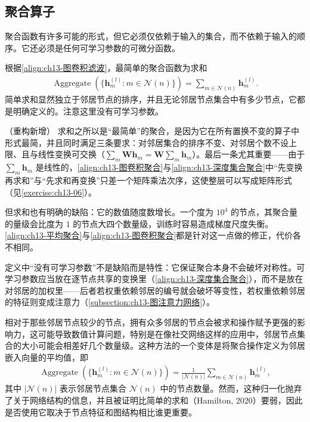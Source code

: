 \documentclass[../../main.tex]{subfiles}
\begin{document}
\subsection{聚合算子}\label{subsection:ch13-聚合算子}

聚合函数有许多可能的形式，但它必须仅依赖于输入的集合，而不依赖于输入的顺序。它还必须是任何可学习参数的可微分函数。

\begin{definition}[聚合算子]\label{definition:ch13-聚合算子}
根据\eqref{align:ch13-图卷积滤波}，最简单的聚合函数为求和
\begin{align}
\operatorname{Aggregate}\!\left(\{\bm{h}_m^{(l)}:m\in\mathcal{N}(n)\}\right)=\sum_{m\in\mathcal{N}(n)}\bm{h}_m^{(l)}.
\label{align:ch13-求和聚合}
\end{align}
简单求和显然独立于邻居节点的排序，并且无论邻居节点集合中有多少节点，它都是明确定义的。注意这里没有可学习参数。
\end{definition}

\begin{remark}（重构新增）
求和之所以是“最简单”的聚合，是因为它在所有置换不变的算子中形式最简，并且同时满足三条要求：对邻居集合的排序不变、对邻居个数不设上限、且与线性变换可交换（$\sum_m\bm{W}\bm{h}_m=\bm{W}\sum_m\bm{h}_m$）。最后一条尤其重要——由于 $\sum_m\bm{h}_m$ 是线性的，\eqref{align:ch13-图卷积聚合}与\eqref{align:ch13-深度集合聚合}中“先变换再求和”与“先求和再变换”只差一个矩阵乘法次序，这使整层可以写成矩阵形式（见\cref{exercise:ch13-06}）。\par
但求和也有明确的缺陷：它的数值随度数增长。一个度为 $10^4$ 的节点，其聚合量的量级会比度为 $1$ 的节点大四个数量级，训练时容易造成梯度尺度失衡。\eqref{align:ch13-平均聚合}与\eqref{align:ch13-图卷积聚合}都是针对这一点做的修正，代价各不相同。\par
定义中“没有可学习参数”不是缺陷而是特性：它保证聚合本身不会破坏对称性。可学习参数应当放在逐节点共享的变换里（\eqref{align:ch13-深度集合聚合}），而不是放在对邻居的加权里——后者若权重依赖邻居的编号就会破坏等变性，若权重依赖邻居的特征则变成注意力（\cref{subsection:ch13-图注意力网络}）。
\end{remark}

相对于那些邻居节点较少的节点，拥有众多邻居的节点会被求和操作赋予更强的影响力，这可能导致数值计算问题，特别是在像社交网络这样的应用中，邻居节点集合的大小可能会相差好几个数量级。这种方法的一个变体是将聚合操作定义为邻居嵌入向量的平均值，即
\begin{align}
\operatorname{Aggregate}\!\left(\{\bm{h}_m^{(l)}:m\in\mathcal{N}(n)\}\right)=\frac{1}{|\mathcal{N}(n)|}\sum_{m\in\mathcal{N}(n)}\bm{h}_m^{(l)},
\label{align:ch13-平均聚合}
\end{align}
其中 $|\mathcal{N}(n)|$ 表示邻居节点集合 $\mathcal{N}(n)$ 中的节点数量。然而，这种归一化抛弃了关于网络结构的信息，并且被证明比简单的求和（Hamilton, 2020）要弱，因此是否使用它取决于节点特征和图结构相比谁更重要。
\end{document}
